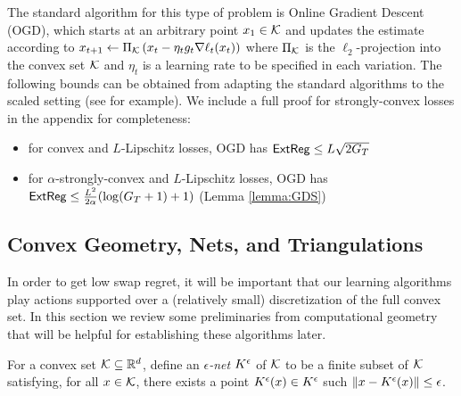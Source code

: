 \documentclass[final,12pt]{alt2025}
\begin{document}
The standard algorithm for this type of problem is Online Gradient Descent (OGD), which starts at an arbitrary point $x_1 \in \mathcal{K}$ and updates the estimate according to $x_{t+1} \gets \Pi_{\mathcal{K}} \left(x_t - \eta_t g_t \nabla \ell_t(x_t)\right)$ where $\Pi_{\mathcal{K}}$ is the $\ell_2$-projection into the convex set $\mathcal{K}$ and $\eta_t$ is a learning rate to be specified in each variation. The following bounds can be obtained from adapting the standard algorithms to the scaled setting (see \cite{hazan2022introduction} for example). We include a full proof for strongly-convex losses in the appendix for completeness:
\begin{itemize}
\item for convex and $L$-Lipschitz losses, OGD has $\operatorname{\mathsf{ExtReg}} \leq  L \sqrt{2G_T}$ 
\item for $\alpha$-strongly-convex and $L$-Lipschitz losses, OGD has  $\operatorname{\mathsf{ExtReg}} \leq \frac{L^2}{2 \alpha} (\log(G_T+1) + 1)$ (Lemma \ref{lemma:GDS})
\end{itemize}

































      











\subsection{Convex Geometry, Nets, and Triangulations}


In order to get low swap regret, it will be important that our learning algorithms play actions supported over a (relatively small) discretization of the full convex set. In this section we review some preliminaries from computational geometry that will be helpful for establishing these algorithms later.

\begin{definition}\label{def:ec}
    For a convex set $\mathcal{K} \subseteq \mathbb{R}^d$, define an \emph{$\epsilon$-net} $K^{\epsilon}$ of $\mathcal{K}$ to be a finite subset of $\mathcal{K}$ satisfying, for all $x \in \mathcal{K}$, there exists a point $K^{\epsilon}(x) \in K^{\epsilon}$ such $\left\|x-K^{\epsilon}(x)\right\| \leq \epsilon$.
\end{definition}
\end{document}
